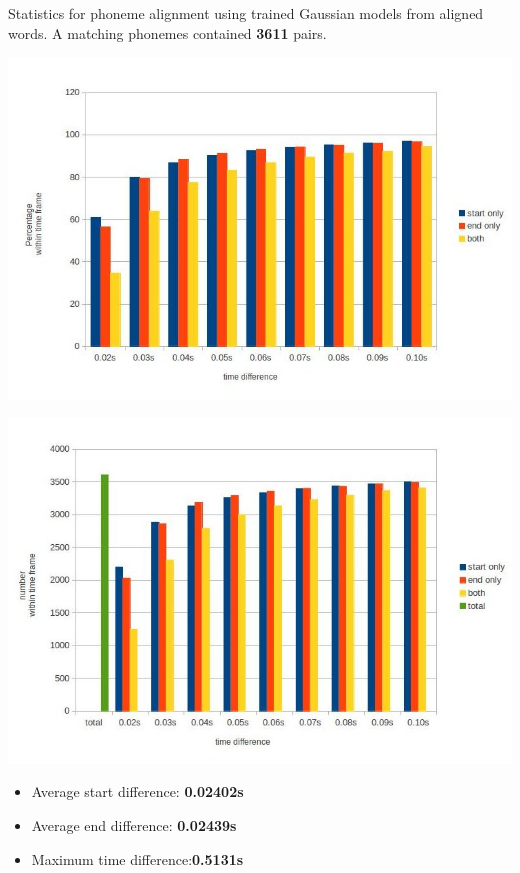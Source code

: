 \documentclass[12pt,a4paper,english]{article}
\begin{document}
Statistics for phoneme alignment using trained Gaussian models from aligned words.
A matching phonemes contained \textbf{3611} pairs.
\begin{center}
    \includegraphics[scale=0.55]{corpora_phoneme_trained_results.jpg}
\end{center}
\begin{center}
    \includegraphics[scale=0.55]{corpora_phoneme_trained_counts.jpg}
\end{center}
\begin{itemize}
    \item Average start difference: \textbf{0.02402s}
    \item Average end difference: \textbf{0.02439s}
    \item Maximum time difference:\textbf{0.5131s}
\end{itemize}
\end{document}
